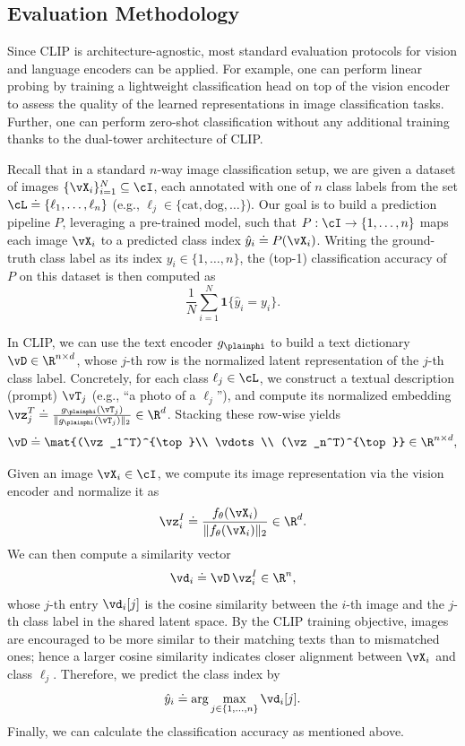 \documentclass[../../book-main.tex]{subfiles}
\begin{document}
\subsection{Evaluation Methodology}\label{sub:clip_eval}
Since CLIP is architecture-agnostic, most standard evaluation
protocols for vision and language encoders can be applied. For
example, one can perform linear probing by training a lightweight
classification head on top of the vision encoder to assess the
quality of the learned representations in image classification tasks.
Further, one can perform zero-shot classification without any
additional training thanks to the dual-tower architecture of CLIP.

Recall that in a standard \(n\)-way image classification setup, we
are given a dataset of images
\(\{\vX_i\}_{i=1}^{N}\subseteq\cI\), each annotated with one of \(n\)
class labels from the set
\(\cL \doteq \{\ell_1,\ldots,\ell_n\}\) (e.g., \(\ell_j \in
\{\text{cat},\text{dog},\ldots\}\)).
Our goal is to build a prediction pipeline \(P\), leveraging a
pre-trained model, such that
\(P:\cI\to\{1,\ldots,n\}\) maps each image \(\vX_i\) to a predicted class index
\(\hat{y}_i \doteq P(\vX_i)\). Writing the ground-truth class label
as its index \(y_i \in \{1,\ldots,n\}\),
the (top-1) classification accuracy of \(P\) on this dataset is then computed as
\[
\frac{1}{N}\sum_{i=1}^{N}\boldsymbol{1}\{\hat{y}_i = y_i\}.
\]

In CLIP, we can use the text encoder \(g_{\plainphi}\) to build a
text dictionary \(\vD\in\R^{n\times d}\), whose \(j\)-th row is the
normalized latent representation of the \(j\)-th class label.
Concretely, for each class \(\ell_j \in \cL\), we construct a textual
description (prompt) \(\vT_j\) (e.g.,
``a photo of a \(\ell_j\)''), and compute its normalized embedding
\(\vz_j^T \doteq
\frac{g_{\plainphi}(\vT_j)}{\|g_{\plainphi}(\vT_j)\|_2} \in \R^{d}\).
Stacking these row-wise yields
\[
\vD \doteq
\mat{(\vz_1^T)^{\top}\\ \vdots \\ (\vz_n^T)^{\top}}
\in \R^{n\times d},
\]

Given an image \(\vX_i \in \cI\), we compute its image representation
via the vision encoder and normalize it as
\[
\vz_i^I \doteq \frac{f_{\theta}(\vX_i)}{\|f_{\theta}(\vX_i)\|_2} \in \R^{d}.
\]
We can then compute a similarity vector
\[
\vd_i \doteq \vD\,\vz_i^I \in \R^{n},
\]
whose \(j\)-th entry \(\vd_i[j]\) is the cosine similarity between
the \(i\)-th image and the \(j\)-th class label
in the shared latent space. By the CLIP training objective, images
are encouraged to be more similar to their
matching texts than to mismatched ones; hence a larger cosine
similarity indicates closer alignment between
\(\vX_i\) and class \(\ell_j\). Therefore, we predict the class index by
\[
\hat{y}_i \doteq \arg\max_{j \in \{1,\ldots,n\}} \vd_i[j].
\]
Finally, we can calculate the classification accuracy as mentioned above.
\end{document}
